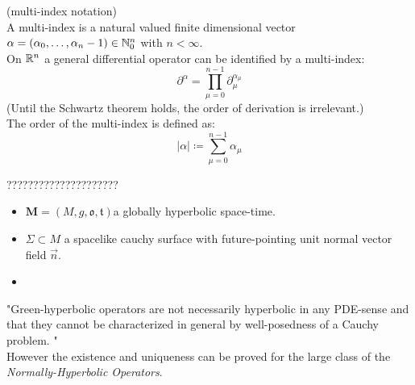 \documentclass[a4paper,12pt]{scrartcl}    %
\begin{document}
	\begin{remark}
	(multi-index notation)
	\\
	A multi-index is a natural valued finite dimensional vector $\alpha = ( \alpha_0, \ldots, \alpha_n-1) \in \mathbb{N}^n_0$ with $n<\infty$.
	\\
	On $\mathbb{R}^n$ a general differential operator can be identified by a multi-index:
	\begin{displaymath}
		\partial^\alpha = \prod_{\mu = 0}^{n-1} \partial_\mu ^{\alpha_\mu}
	\end{displaymath}
	(Until the Schwartz theorem holds, the order of derivation is irrelevant.)
	\\
	The order of the multi-index is defined as:
	\begin{displaymath}
		\vert \alpha \vert \coloneqq \sum_{\mu=0}^{n-1} \alpha_\mu
	\end{displaymath}
	\end{remark}

	?????????????????????
	\begin{proposition}
		\begin{hypothesis}
			\begin{itemize}
				\item $\mathbf{M} = (M,g,\mathfrak{o},\mathfrak{t}) $a globally hyperbolic space-time.
				\item $\Sigma \subset M$ a spacelike cauchy surface with future-pointing unit normal vector field $\vec{n}$.
				\item 
			\end{itemize}
		\end{hypothesis}
	\begin{thesis}

	\end{thesis}
	\end{proposition}
	\begin{observation}
	"Green-hyperbolic operators are not necessarily hyperbolic in any PDE-sense and that they cannot be characterized in general by well-posedness of a Cauchy problem.	" \cite{Terlaky2010} \cite{Bar2010}
	\\
	However the existence and uniqueness can be proved for the large class of the \emph{Normally-Hyperbolic Operators}.
	
	\end{observation}
\end{document}
